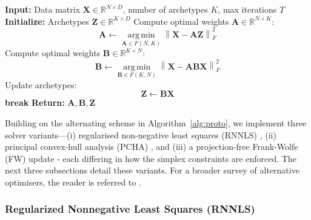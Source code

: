 \documentclass{article}
\begin{document}
\begin{algorithm}[H]
    \caption{Prototypical Algorithm}
    \label{alg:proto}
    \begin{algorithmic}[1]
    \State \textbf{Input:} Data matrix $\mathbf{X} \in \mathbb{R}^{N \times D}$, number of archetypes $K$, max iterations $T$
    \State \textbf{Initialize:} Archetypes $\mathbf{Z} \in \mathbb{R}^{K \times D}$
        \State Compute optimal weights $\mathbf{A} \in \mathbb{R}^{N \times K}$: \label{proto:computeA}
        \begin{equation}
        \mathbf{A} \gets \operatorname*{arg\,min}_{\mathbf{A} \in F(N, K)} \left\| \mathbf{X} - \mathbf{A} \mathbf{Z} \right\|_F^2
        \end{equation}
        \State Compute optimal weights $\mathbf{B} \in \mathbb{R}^{K \times N}$: \label{proto:computeB}
        \begin{equation}
        \mathbf{B} \gets \operatorname*{arg\,min}_{\mathbf{B} \in F(K, N)} \left\| \mathbf{X} - \mathbf{A} \mathbf{B} \mathbf{X} \right\|_F^2
        \end{equation}
        \State Update archetypes:
        \begin{equation}
        \mathbf{Z} \gets \mathbf{B} \mathbf{X}
        \end{equation}
         \label{proto:convergence}
            \State \textbf{break}
        \EndIf
    \EndFor
    \State \textbf{Return:} $\mathbf{A}, \mathbf{B}, \mathbf{Z}$
    \end{algorithmic}
\end{algorithm}

Building on the alternating scheme in Algorithm~\ref{alg:proto}, we implement three solver variants—(i) regularised non-negative least squares (RNNLS) \autocite{cutlerArchetypalAnalysis1994}, (ii) principal convex-hull analysis (PCHA) \autocite{morupArchetypalAnalysisMachine2012}, and (iii) a projection-free Frank-Wolfe (FW) update \autocite{bauckhageArchetypalAnalysisAutoencoder2015} - each differing in how the simplex constraints are enforced. The next three subsections detail these variants.  For a broader survey of alternative optimisers, the reader is referred to \textcite{alcacerSurveyArchetypalAnalysis2025}.

\subsubsection{Regularized Nonnegative Least Squares (RNNLS)}
\end{document}
